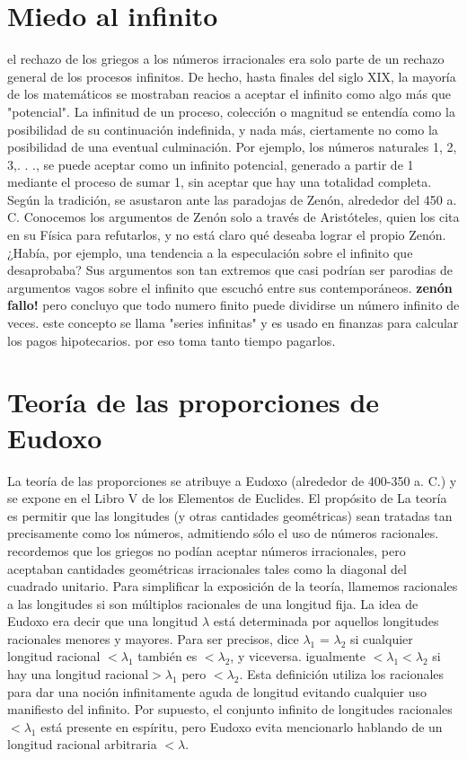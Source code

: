\documentclass{book}
\begin{document}
    \section{Miedo al infinito}
    el rechazo de los griegos a los números irracionales era solo parte de un rechazo general de los procesos infinitos.
    De hecho, hasta finales del siglo XIX, la mayoría de los matemáticos se mostraban reacios a aceptar el infinito como algo más que "potencial".
    La infinitud de un proceso, colección o magnitud se entendía como la posibilidad de su continuación indefinida, y nada más, ciertamente no como la posibilidad de una eventual culminación. Por ejemplo, los números naturales 1, 2, 3,. . ., se puede aceptar como un infinito potencial, generado a partir de 1 mediante el proceso de sumar 1, sin aceptar que hay una totalidad completa.
    Según la tradición, se asustaron ante las paradojas de Zenón, alrededor del 450 a. C.
    Conocemos los argumentos de Zenón solo a través de Aristóteles, quien los cita
    en su Física para refutarlos, y no está claro qué deseaba lograr el propio Zenón. ¿Había, por ejemplo, una tendencia a la especulación sobre el infinito que desaprobaba? Sus argumentos son tan extremos que casi podrían ser parodias de argumentos vagos sobre el infinito que escuchó entre
    sus contemporáneos.
    \textbf{zenón fallo!} pero concluyo que todo numero finito puede dividirse un número infinito de veces.
    este concepto se llama "series infinitas" y es usado en finanzas para calcular los pagos hipotecarios. por eso toma tanto tiempo pagarlos.
    
    \section{Teoría de las proporciones de Eudoxo}
    La teoría de las proporciones se atribuye a Eudoxo (alrededor de 400-350 a. C.)
    y se expone en el Libro V de los Elementos de Euclides. El propósito de
    La teoría es permitir que las longitudes (y otras cantidades geométricas) sean tratadas
    tan precisamente como los números, admitiendo sólo el uso de números racionales.
    recordemos que los griegos no podían aceptar números irracionales, pero aceptaban cantidades geométricas irracionales tales
    como la diagonal del cuadrado unitario. Para simplificar la exposición de la teoría,
    llamemos racionales a las longitudes si son múltiplos racionales de una longitud fija.
    La idea de Eudoxo era decir que una longitud $\lambda$ está determinada por aquellos
    longitudes racionales menores y mayores. Para ser precisos, dice
    $\lambda_{1}$ = $\lambda_{2}$ si cualquier longitud racional $<\lambda_{1}$  también es $<\lambda_{2}$, y viceversa. igualmente
    $<\lambda_{1}<\lambda_{2}$ si hay una longitud racional$>\lambda_{1}$ pero $<\lambda_{2}$. Esta definición utiliza
    los racionales para dar una noción infinitamente aguda de longitud evitando
    cualquier uso manifiesto del infinito. Por supuesto, el conjunto infinito de longitudes racionales $<\lambda_{1}$
    está presente en espíritu, pero Eudoxo evita mencionarlo hablando de un
    longitud racional arbitraria $<\lambda$.

    \section{}
    
\end{document}
